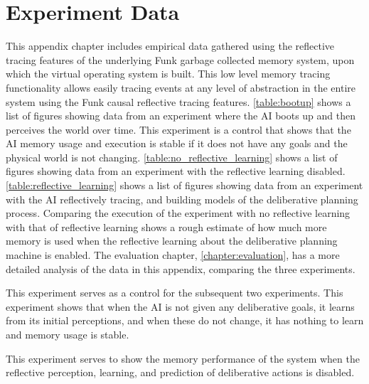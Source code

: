 \chapter{Experiment Data}
\label{chapter:experiment_data}

This appendix chapter includes empirical data gathered using the
reflective tracing features of the underlying Funk garbage collected
memory system, upon which the virtual operating system is built.  This
low level memory tracing functionality allows easily tracing events at
any level of abstraction in the entire system using the Funk causal
reflective tracing features.  \autoref{table:bootup} shows a list of
figures showing data from an experiment where the AI boots up
and then perceives the world over time.  This experiment is a control
that shows that the AI memory usage and execution is stable if it does
not have any goals and the physical world is not changing.
\autoref{table:no_reflective_learning} shows a list of figures showing
data from an experiment with the reflective learning disabled.
\autoref{table:reflective_learning} shows a list of figures showing
data from an experiment with the AI reflectively tracing, and building
models of the deliberative planning process.  Comparing the execution
of the experiment with no reflective learning with that of reflective
learning shows a rough estimate of how much more memory is used when
the reflective learning about the deliberative planning machine is
enabled.  The evaluation chapter, \autoref{chapter:evaluation}, has a
more detailed analysis of the data in this appendix, comparing the
three experiments.

 {This experiment serves as a control for the
  subsequent two experiments.  This experiment shows that when the AI
  is not given any deliberative goals, it learns from its initial
  perceptions, and when these do not change, it has nothing to learn
  and memory usage is stable.}

 {This experiment serves to show the memory
  performance of the system when the reflective perception, learning,
  and prediction of deliberative actions is disabled.}

